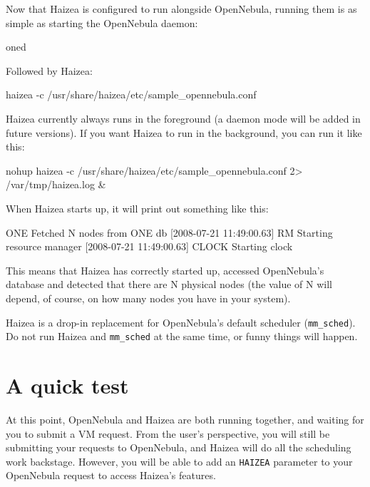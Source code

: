 Now that Haizea is configured to run alongside OpenNebula, running them is as simple as starting the OpenNebula daemon:

\begin{wideshellverbatim}
oned
\end{wideshellverbatim}

Followed by Haizea:

\begin{wideshellverbatim}
haizea -c /usr/share/haizea/etc/sample_opennebula.conf
\end{wideshellverbatim}

Haizea currently always runs in the foreground (a daemon mode will be added in future versions). If you want Haizea to run in the background, you can run it like this:

\begin{wideshellverbatim}
nohup haizea -c /usr/share/haizea/etc/sample_opennebula.conf 2> /var/tmp/haizea.log &
\end{wideshellverbatim}

When Haizea starts up, it will print out something like this:

\begin{wideshellverbatim}
[2008-07-21 11:49:00.63] ONE     Fetched N nodes from ONE db
[2008-07-21 11:49:00.63] RM      Starting resource manager
[2008-07-21 11:49:00.63] CLOCK   Starting clock
\end{wideshellverbatim}

This means that Haizea has correctly started up, accessed OpenNebula's database and detected that there are N physical nodes (the value of N will depend, of course, on how many nodes you have in your system).

\begin{warning}
Haizea is a drop-in replacement for OpenNebula's default scheduler (\texttt{mm\_sched}). Do not run Haizea and \texttt{mm\_sched} at the same time, or funny things will happen.
\end{warning}

\section{A quick test}

At this point, OpenNebula and Haizea are both running together, and waiting for you to submit a VM request. From the user's perspective, you will still be submitting your requests to OpenNebula, and Haizea will do all the scheduling work backstage. However, you will be able to add an \texttt{HAIZEA} parameter to your OpenNebula request to access Haizea's features.


